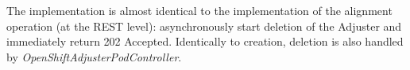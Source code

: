 \documentclass[../main.tex]{subfiles}
\begin{document}
The implementation is almost identical to the implementation of the alignment operation (at the REST level): asynchronously start deletion of the Adjuster and immediately return 202 Accepted. Identically to creation, deletion is also handled by \textit{OpenShiftAdjusterPodController}.
\end{document}
